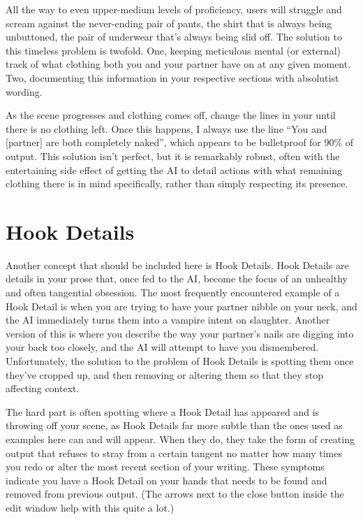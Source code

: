 \documentclass[Source-main.tex]{subfiles}
\begin{document}
All the way to even upper-medium levels of proficiency, users will struggle and scream against the never-ending pair of pants, the shirt that is always being unbuttoned, the pair of underwear that’s always being slid off.
The solution to this timeless problem is twofold.
One, keeping meticulous mental (or external) track of what clothing both you and your partner have on at any given moment.
Two, documenting this information in your respective \rem sections with absolutist wording.

As the scene progresses and clothing comes off, change the lines in your \rem until there is no clothing left.
Once this happens, I always use the line “You and [partner] are both completely naked”, which appears to be bulletproof for 90\% of output.
This solution isn’t perfect, but it is remarkably robust, often with the entertaining side effect of getting the AI to detail actions with what remaining clothing there is in mind specifically, rather than simply respecting its presence.

\section{Hook Details}

Another concept that should be included here is Hook Details.
Hook Details are details in your prose that, once fed to the AI, become the focus of an unhealthy and often tangential obsession.
The most frequently encountered example of a Hook Detail is when you are trying to have your partner nibble on your neck, and the AI immediately turns them into a vampire intent on slaughter.
Another version of this is where you describe the way your partner’s nails are digging into your back too closely, and the AI will attempt to have you dismembered.
Unfortunately, the solution to the problem of Hook Details is spotting them once they’ve cropped up, and then removing or altering them so that they stop affecting context.

The hard part is often spotting where a Hook Detail has appeared and is throwing off your scene, as Hook Details far more subtle than the ones used as examples here can and will appear.
When they do, they take the form of creating output that refuses to stray from a certain tangent no matter how many times you redo or alter the most recent section of your writing.
These symptoms indicate you have a Hook Detail on your hands that needs to be found and removed from previous output.
(The arrows next to the close button inside the edit window help with this quite a lot.)
\end{document}
